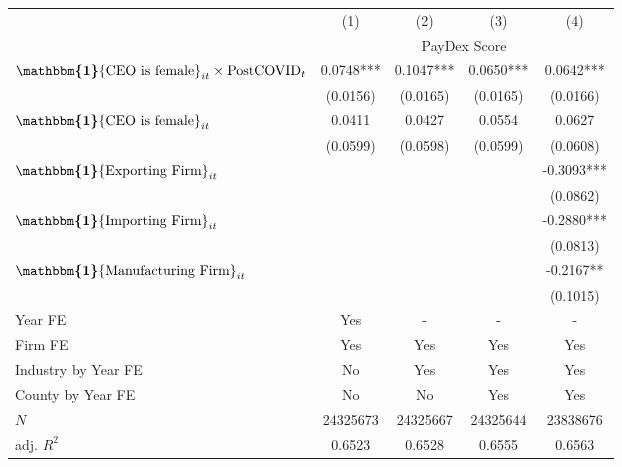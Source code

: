 {
\def\sym#1{\ifmmode^{#1}\else\(^{#1}\)\fi}
\begin{tabular}{l*{4}{c}}
\hline\hline
            &\multicolumn{1}{c}{(1)}&\multicolumn{1}{c}{(2)}&\multicolumn{1}{c}{(3)}&\multicolumn{1}{c}{(4)}\\
            &\multicolumn{4}{c}{PayDex Score}\\
\hline
$\boldsymbol{\mathbbm{1}} \text{\{CEO is female\}}_{it} \times \text{PostCOVID}_t$ &      0.0748***&      0.1047***&      0.0650***&      0.0642***\\
            &    (0.0156)   &    (0.0165)   &    (0.0165)   &    (0.0166)   \\
$\boldsymbol{\mathbbm{1}} \text{\{CEO is female\}}_{it}$   &      0.0411   &      0.0427   &      0.0554   &      0.0627   \\
            &    (0.0599)   &    (0.0598)   &    (0.0599)   &    (0.0608)   \\
$\boldsymbol{\mathbbm{1}} \text{\{Exporting Firm\}}_{it}$    &               &               &               &     -0.3093***\\
            &               &               &               &    (0.0862)   \\
$\boldsymbol{\mathbbm{1}} \text{\{Importing Firm\}}_{it}$    &               &               &               &     -0.2880***\\
            &               &               &               &    (0.0813)   \\
$\boldsymbol{\mathbbm{1}} \text{\{Manufacturing Firm\}}_{it}$ &               &               &               &     -0.2167** \\
            &               &               &               &    (0.1015)   \\
Year FE     &         Yes   &         -   &         -   &         -   \\
Firm FE     &         Yes   &         Yes   &         Yes   &         Yes   \\
Industry by Year FE&          No   &         Yes   &         Yes   &         Yes   \\
County by Year FE&          No   &          No   &         Yes   &         Yes   \\
\hline
\(N\)       &    24325673   &    24325667   &    24325644   &    23838676   \\
adj. \(R^{2}\)&      0.6523   &      0.6528   &      0.6555   &      0.6563   \\
\hline\hline
\end{tabular}
}